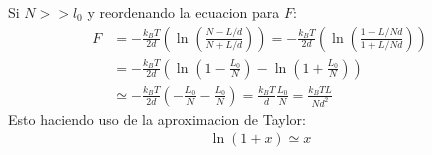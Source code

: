 \begin{answer}
    Si $N>>l_0$ y reordenando la ecuacion para $F$:
    \begin{align*}
        F &= -\frac{k_B T}{2d} \left(
            \ln\left(\frac{N - L/d}{N + L/d}\right)
        \right)= -\frac{k_B T}{2d} \left(
            \ln\left(\frac{1 - L/Nd}{1 + L/Nd}\right)
        \right) \\
        &= -\frac{k_B T}{2d} \left(
            \ln\left(1 - \frac{L_0}{N}\right) - \ln\left(1 + \frac{L_0}{N}\right)
        \right)\\
        &\simeq -\frac{k_B T}{2d} \left(
            - \frac{L_0}{N} - \frac{L_0}{N}
        \right) = \frac{k_B T}{d} \frac{L_0}{N}= \frac{k_B T L}{Nd^2} 
    \end{align*}
    Esto haciendo uso de la aproximacion de Taylor:
    \begin{align*}
        \ln(1 + x) \simeq x
    \end{align*}
\end{answer}